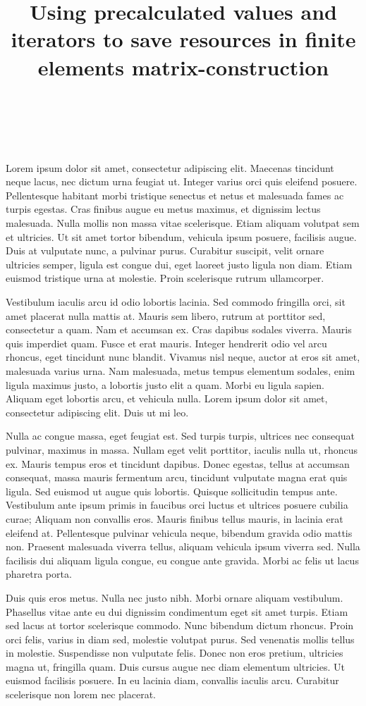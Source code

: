 \documentclass[a4paper]{article}
\title{Using precalculated values and iterators to save resources in finite elements matrix-construction}
\author{
    \templauthoremail{Daniel K. Hashimoto V. de Andrade}{dkhashimoto@ic.ufrj.br} \\
    \templlocation{UFRJ, Rio de Janeiro, RJ} \\
}
\begin{document}
\maketitle

Lorem ipsum dolor sit amet, consectetur adipiscing elit. Maecenas tincidunt neque lacus, nec dictum urna feugiat ut. Integer varius orci quis eleifend posuere. Pellentesque habitant morbi tristique senectus et netus et malesuada fames ac turpis egestas. Cras finibus augue eu metus maximus, et dignissim lectus malesuada. Nulla mollis non massa vitae scelerisque. Etiam aliquam volutpat sem et ultricies. Ut sit amet tortor bibendum, vehicula ipsum posuere, facilisis augue. Duis at vulputate nunc, a pulvinar purus. Curabitur suscipit, velit ornare ultricies semper, ligula est congue dui, eget laoreet justo ligula non diam. Etiam euismod tristique urna at molestie. Proin scelerisque rutrum ullamcorper.

Vestibulum iaculis arcu id odio lobortis lacinia. Sed commodo fringilla orci, sit amet placerat nulla mattis at. Mauris sem libero, rutrum at porttitor sed, consectetur a quam. Nam et accumsan ex. Cras dapibus sodales viverra. Mauris quis imperdiet quam. Fusce et erat mauris. Integer hendrerit odio vel arcu rhoncus, eget tincidunt nunc blandit. Vivamus nisl neque, auctor at eros sit amet, malesuada varius urna. Nam malesuada, metus tempus elementum sodales, enim ligula maximus justo, a lobortis justo elit a quam. Morbi eu ligula sapien. Aliquam eget lobortis arcu, et vehicula nulla. Lorem ipsum dolor sit amet, consectetur adipiscing elit. Duis ut mi leo.

Nulla ac congue massa, eget feugiat est. Sed turpis turpis, ultrices nec consequat pulvinar, maximus in massa. Nullam eget velit porttitor, iaculis nulla ut, rhoncus ex. Mauris tempus eros et tincidunt dapibus. Donec egestas, tellus at accumsan consequat, massa mauris fermentum arcu, tincidunt vulputate magna erat quis ligula. Sed euismod ut augue quis lobortis. Quisque sollicitudin tempus ante. Vestibulum ante ipsum primis in faucibus orci luctus et ultrices posuere cubilia curae; Aliquam non convallis eros. Mauris finibus tellus mauris, in lacinia erat eleifend at. Pellentesque pulvinar vehicula neque, bibendum gravida odio mattis non. Praesent malesuada viverra tellus, aliquam vehicula ipsum viverra sed. Nulla facilisis dui aliquam ligula congue, eu congue ante gravida. Morbi ac felis ut lacus pharetra porta.

Duis quis eros metus. Nulla nec justo nibh. Morbi ornare aliquam vestibulum. Phasellus vitae ante eu dui dignissim condimentum eget sit amet turpis. Etiam sed lacus at tortor scelerisque commodo. Nunc bibendum dictum rhoncus. Proin orci felis, varius in diam sed, molestie volutpat purus. Sed venenatis mollis tellus in molestie. Suspendisse non vulputate felis. Donec non eros pretium, ultricies magna ut, fringilla quam. Duis cursus augue nec diam elementum ultricies. Ut euismod facilisis posuere. In eu lacinia diam, convallis iaculis arcu. Curabitur scelerisque non lorem nec placerat.
\end{document}
